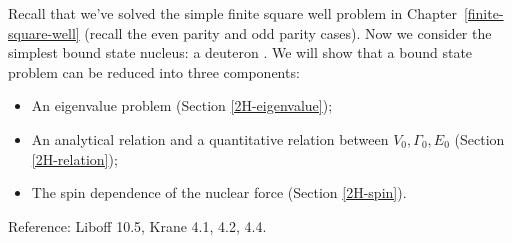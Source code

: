 \documentclass{school-22.101-notes}
\date{October 17, 2011}
\begin{document}
\maketitle


Recall that we've solved the simple finite square well problem in Chapter~\ref{finite-square-well} (recall the even parity and odd parity cases). Now we consider the simplest bound state nucleus: a deuteron . We will show that a bound state problem can be reduced into three components:
\begin{itemize}
\item An eigenvalue problem (Section \ref{2H-eigenvalue});
\item An analytical relation and a quantitative relation between $V_0, \Gamma_0, E_0$ (Section \ref{2H-relation});
\item The spin dependence of the nuclear force (Section \ref{2H-spin}).
\end{itemize}
Reference: Liboff 10.5, Krane 4.1, 4.2, 4.4.
\end{document}
